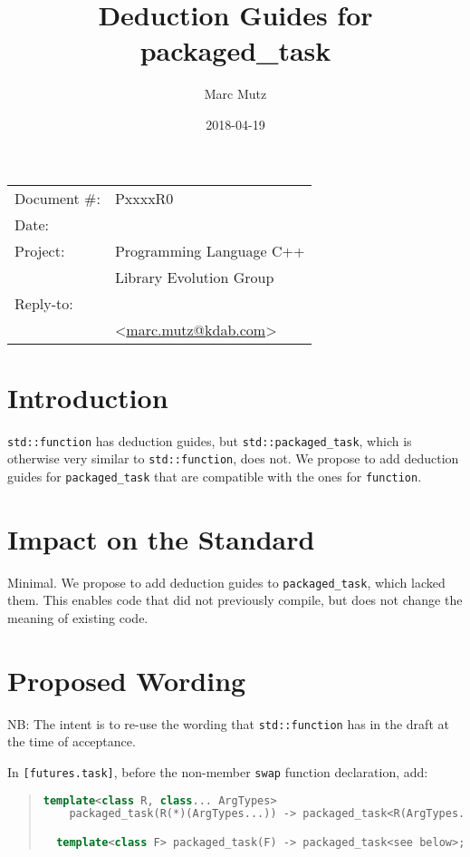 \documentclass[11pt]{article}
\date{}
\title{Deduction Guides for packaged\_task}
\makeatletter
\newcommand{\emailaddress}{marc.mutz@kdab.com}
\newcommand{\email}{\href{mailto:\emailaddress}{\emailaddress}}
\makeatother
\begin{document}
\maketitle\vspace{-2cm}

\begin{flushright}
  \begin{tabular}{ll}
  Document \#:&PxxxxR0\\
  Date:       &\date{2018-04-19}\\
  Project:    &Programming Language C++\\
              &Library Evolution Group\\
  Reply-to:   &\author{Marc Mutz}\\
              &\textless\email\textgreater
  \end{tabular}
\end{flushright}

\section{Introduction}

\texttt{std::function} has deduction guides, but
\texttt{std::packaged\_task}, which is otherwise very similar to
\texttt{std::function}, does not. We propose to add deduction guides
for \texttt{packaged\_task} that are compatible with the ones for
\texttt{function}.

\section{Impact on the Standard}

Minimal. We propose to add deduction guides to
\texttt{packaged\_task}, which lacked them. This enables code that did
not previously compile, but does not change the meaning of existing code.

\section{Proposed Wording}

NB: The intent is to re-use the wording that \texttt{std::function} has in
the draft at the time of acceptance.

In \texttt{[futures.task]}, before the non-member
\texttt{swap} function declaration, add:

\begin{quote}
\begin{lstlisting}[language=C++]
  template<class R, class... ArgTypes>
    packaged_task(R(*)(ArgTypes...)) -> packaged_task<R(ArgTypes...)>;

  template<class F> packaged_task(F) -> packaged_task<see below>;
\end{lstlisting}
\end{quote}
\end{document}
